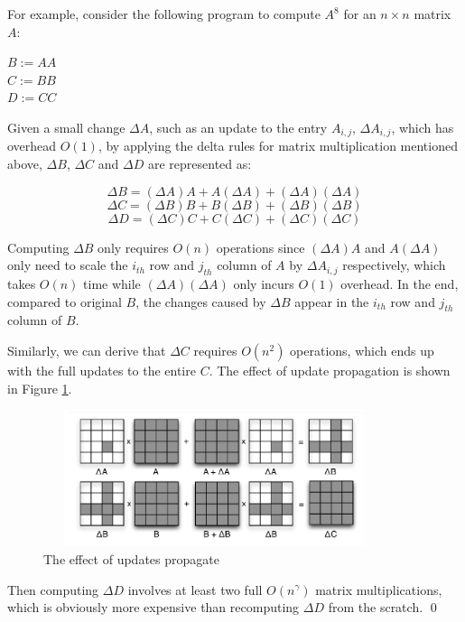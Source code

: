 \begin{example}\label{eg: incremental_naive_update}
For example, consider the following program to compute $A^8$ for an $n\times n$ matrix $A$:

\begin{center}
    $B:= AA$\\
    $C:= BB$\\
    $D:= CC$
\end{center}

Given a small change $\Delta A$, such as an update to the entry $A_{i,j}$, $\Delta A_{i,j}$, which has overhead $O(1)$, by applying the delta rules for matrix multiplication mentioned above, $\Delta B$, $\Delta C$ and $\Delta D$ are represented as:

\begin{equation}\label{eq: delta_b}
    \Delta B = (\Delta A) A + A (\Delta A) + (\Delta A) (\Delta A)
\end{equation}
\begin{equation}\label{eq: delta_c}
    \Delta C = (\Delta B) B + B (\Delta B) + (\Delta B) (\Delta B)
\end{equation}
\begin{equation}\label{eq: delta_d}
    \Delta D = (\Delta C) C + C (\Delta C) + (\Delta C) (\Delta C)
\end{equation}
    


Computing $\Delta B$ only requires $O(n)$ operations since $(\Delta A) A$ and $A (\Delta A)$ only need to scale the $i_{th}$ row and $j_{th}$ column of $A$ by $\Delta A_{i,j}$ respectively, which takes $O(n)$ time while $(\Delta A) (\Delta A)$ only incurs $O(1)$ overhead. In the end, compared to original $B$, the changes caused by $\Delta B$ appear in the $i_{th}$ row and $j_{th}$ column of $B$.

Similarly, we can derive that $\Delta C$ requires $O(n^2)$ operations, which ends up with the full updates to the entire $C$. The effect of update propagation is shown in Figure \ref{fig:update_propagete}.

\begin{figure}
    \centering
    \includegraphics[width=10cm, height=4cm]{Figures/update_propagation.png}
    \caption{The effect of updates propagate}
    \label{fig:update_propagete}
\end{figure}

Then computing $\Delta D$ involves at least two full $O(n^{\gamma})$ matrix multiplications, which is obviously more expensive than recomputing $\Delta D$ from the scratch. \qed
\end{example}


